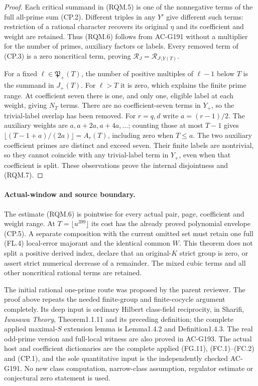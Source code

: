 \begin{proof}
Each critical summand in (RQM.5) is one of the nonnegative terms
of the full all-prime sum (CP.2). Different triples in any $Y'$
give different such terms: restriction of a rational character
recovers its original $\eta$ and its coefficient and weight are
retained. Thus (RQM.6) follows from AC-G191 without a multiplier
for the number of primes, auxiliary factors or labels.
Every removed term of (CP.3) is a zero noncritical term, proving
$\mathcal R_J=\mathcal R_{J\setminus Y(T)}$.

For a fixed $\ell\in\mathfrak P_+(T)$, the number of positive
multiples of $\ell-1$ below $T$ is the summand in $J_+(T)$.
For $\ell>T$ it is zero, which explains the finite prime range.
At coefficient seven there is one, and only one, eligible label
at each weight, giving $N_T$ terms. There are no coefficient-seven
terms in $Y_+$, so the trivial-label overlap has been removed.
For $r=q,d$ write $a=(r-1)/2$. The auxiliary weights are
$a,a+2a,a+4a,\ldots$; counting those at most $T-1$ gives
$\lfloor(T-1+a)/(2a)\rfloor=A_r(T)$, including zero when $T\leq a$.
The two auxiliary coefficient primes are distinct and exceed seven.
Their finite labels are nontrivial, so they cannot coincide with
any trivial-label term in $Y_+$, even when that coefficient is split.
These observations prove the internal disjointness and (RQM.7).
\end{proof}

\paragraph{Actual-window and source boundary.}
The estimate (RQM.6) is pointwise for every actual pair, page,
coefficient and weight range. At $T=\lfloor u^{399}\rfloor$ its
cost has the already proved polynomial envelope (CP.5).
A separate composition with the current omitted set must retain
one full (FL.4) local-error majorant and the identical common $W$.
This theorem does not split a positive derived index, declare
that an original-$K$ strict group is zero, or assert strict numerical
decrease of a remainder. The mixed cubic terms and all other
noncritical rational terms are retained.

The initial rational one-prime route was proposed by the parent
reviewer. The proof above repeats the needed finite-group and
finite-cocycle argument completely. Its deep input is ordinary
Hilbert class-field reciprocity, in Sharifi, \emph{Iwasawa Theory},
Theorem1.1.11 and its preceding definition; the complete applied
maximal-$S$ extension lemma is Lemma1.4.2 and Definition1.4.3.
The real odd-prime version and full-local witness are also proved
in AC-G193. The actual host and coefficient dictionaries are the
complete applied (FG.11), (FC.1)--(FC.2) and (CP.1), and the sole
quantitative input is the independently checked AC-G191.
No new class computation, narrow-class assumption, regulator
estimate or conjectural zero statement is used.
